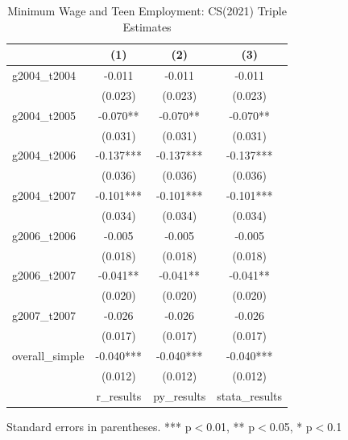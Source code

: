 \begin{table}[htbp]
\centering
\caption{Minimum Wage and Teen Employment: CS(2021) Triple Estimates}
\begin{tabular}{lccc}
\toprule
 & (1) & (2) & (3) \\
\midrule
g2004_t2004 & -0.011 & -0.011 & -0.011 \\
 & (0.023) & (0.023) & (0.023) \\
g2004_t2005 & -0.070** & -0.070** & -0.070** \\
 & (0.031) & (0.031) & (0.031) \\
g2004_t2006 & -0.137*** & -0.137*** & -0.137*** \\
 & (0.036) & (0.036) & (0.036) \\
g2004_t2007 & -0.101*** & -0.101*** & -0.101*** \\
 & (0.034) & (0.034) & (0.034) \\
g2006_t2006 & -0.005 & -0.005 & -0.005 \\
 & (0.018) & (0.018) & (0.018) \\
g2006_t2007 & -0.041** & -0.041** & -0.041** \\
 & (0.020) & (0.020) & (0.020) \\
g2007_t2007 & -0.026 & -0.026 & -0.026 \\
 & (0.017) & (0.017) & (0.017) \\
overall_simple & -0.040*** & -0.040*** & -0.040*** \\
 & (0.012) & (0.012) & (0.012) \\
\midrule
 & r_results & py_results & stata_results \\
\bottomrule
\end{tabular}
\begin{flushleft}\footnotesize Standard errors in parentheses. *** p$<$0.01, ** p$<$0.05, * p$<$0.1\end{flushleft}
\end{table}
